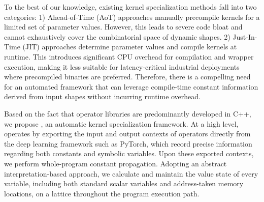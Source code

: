 To the best of our knowledge, existing kernel specialization methods fall into two categories:
1) Ahead-of-Time (AoT) approaches \cite{ye2025flashinfer,nvidia2021cublas} manually precompile kernels for a limited set of parameter values. However, this leads to severe code bloat and cannot exhaustively cover the combinatorial space of dynamic shapes.
2) Just-In-Time (JIT) approaches \cite{chenTVMAutomatedEndtoend2018,tillet2019triton,zheng2020ansor} determine parameter values and compile kernels at runtime. This introduces significant CPU overhead for compilation and wrapper execution, making it less suitable for latency-critical industrial deployments where precompiled binaries are preferred.
Therefore, there is a compelling need for an automated framework that can leverage compile-time constant information derived from input shapes without incurring runtime overhead.

Based on the fact that operator libraries are predominantly developed in C++, we propose \mysys, an automatic kernel specialization framework.
At a high level, \mysys operates by exporting the input and output contexts of operators directly from the deep learning framework such as PyTorch, which record precise information regarding both constants and symbolic variables.
Upon these exported contexts, we perform whole-program constant propagation.
Adopting an abstract interpretation-based approach, we calculate and maintain the value state of every variable, including both standard scalar variables and address-taken memory locations, on a lattice throughout the program execution path.


